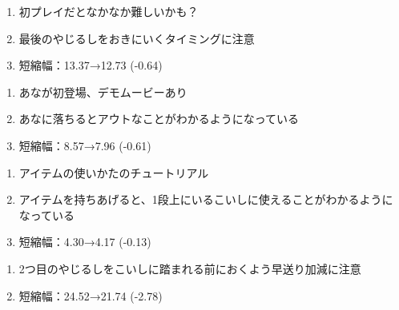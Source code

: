 \begin{enumerate}[label={\sarrow}]
\item 初プレイだとなかなか難しいかも？
\item 最後のやじるしをおきにいくタイミングに注意
\item 短縮幅：13.37→12.73 (-0.64)
\end{enumerate}



\begin{enumerate}[label={\sarrow}]
\item あなが初登場、デモムービーあり
\item あなに落ちるとアウトなことがわかるようになっている
\item 短縮幅：8.57→7.96 (-0.61)
\end{enumerate}



\clearpage
\begin{enumerate}[label={\sarrow}]
\item アイテムの使いかたのチュートリアル
\item アイテムを持ちあげると、1段上にいるこいしに使えることがわかるようになっている
\item 短縮幅：4.30→4.17 (-0.13)
\end{enumerate}



\begin{enumerate}[label={\sarrow}]
\item 2つ目のやじるしをこいしに踏まれる前におくよう早送り加減に注意
\item 短縮幅：24.52→21.74 (-2.78)
\end{enumerate}



